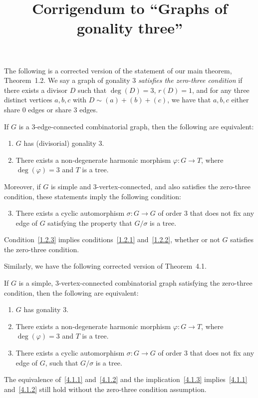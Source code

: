 \documentclass[ALCO,ThmDefs,Unicode]{cedram}
\title{Corrigendum to ``Graphs of gonality three''}
\author[\initial{I.} Aidun]{\firstname{Ivan} \lastname{Aidun}}
\author[\initial{F.} Dean]{\firstname{Frances} \lastname{Dean}}
\author[\initial{R.} Morrison]{\firstname{Ralph} \lastname{Morrison}}
\author[\initial{T.} Yu]{\firstname{Teresa} \lastname{Yu}}
\author[\initial{J.} Yuan]{\firstname{Julie} \lastname{Yuan}}
\begin{document}
\maketitle

The following is a corrected version of the statement of our main theorem, Theorem~1.2.
We say a graph of gonality $3$ \emph{satisfies the zero-three condition} if there exists a divisor $D$ such that $\deg(D)=3$, $r(D)=1$, and for any three distinct vertices $a,b,c$ with $D\sim (a)+(b)+(c)$, we have that $a,b,c$ either share $0$ edges or share $3$ edges.

\renewcommand*{\thecdrthm}{1.2}
\begin{theo}\label{thm:maintheorem}
If $G$ is a $3$-edge-connected combinatorial graph, then the following are equivalent:
\begin{enumerate}
\item \label{1.2.1} $G$ has \textup{(}divisorial\textup{)} gonality $3$.
\item \label{1.2.2} There exists a non-degenerate harmonic morphism $\varphi : G \to T$, where $\deg(\varphi) = 3$ and $T$ is a tree.
\end{enumerate}
Moreover, if $G$ is simple and $3$-vertex-connected, and also satisfies the zero-three condition, these statements imply the following condition:
\begin{enumerate}\setcounter{enumi}{2}
\item \label{1.2.3} There exists a cyclic automorphism $\sigma: G \to G$ of order $3$ that does not fix any edge of $G$ satisfying the property that $G/\sigma$ is a tree.
\end{enumerate}
Condition~\eqref{1.2.3} implies conditions~\eqref{1.2.1} and~\eqref{1.2.2}, whether or not $G$ satisfies the zero-three condition.
\end{theo}

Similarly, we have the following corrected version of Theorem~4.1.

\renewcommand*{\thecdrthm}{4.1}
\begin{theo}\label{thm:simpletheorem}
If $G$ is a simple, $3$-vertex-connected combinatorial graph satisfying the zero-three condition, then the following are equivalent:
\begin{enumerate}
\item \label{4.1.1} $G$ has gonality $3$.
\item \label{4.1.2} There exists a non-degenerate harmonic morphism $\varphi : G \to T$, where $\deg(\varphi) = 3$ and $T$ is a tree.
\item \label{4.1.3} There exists a cyclic automorphism $\sigma: G \to G$ of order $3$ that does not fix any edge of $G$, such that $G/\sigma$ is a tree.
\end{enumerate}
The equivalence of~\eqref{4.1.1} and~\eqref{4.1.2} and the implication~\eqref{4.1.3} implies~\eqref{4.1.1} and~\eqref{4.1.2} still hold without the zero-three condition assumption.
\end{theo}
\end{document}
